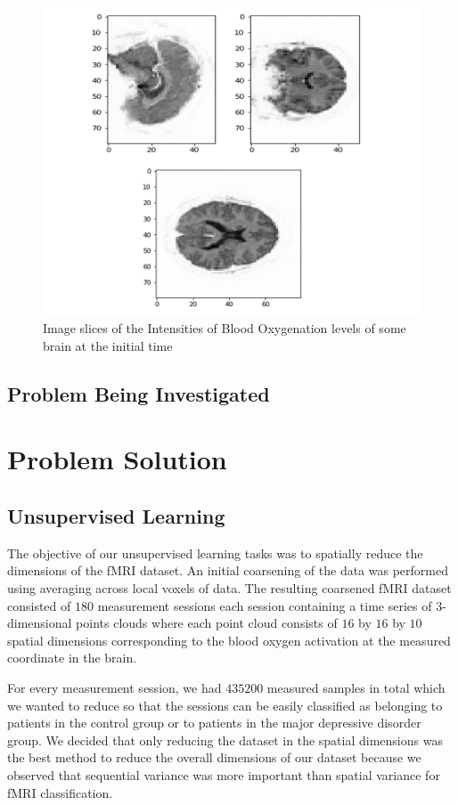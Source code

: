 \documentclass{article}[12pt]
\begin{document}
   \begin{figure}[!htb]
   	\centering
   	\includegraphics[scale=0.7]{brain_slices}
   	\caption{Image slices of the Intensities of Blood Oxygenation levels of some brain at the initial time}
   	\label{fig:brainSlice}
   \end{figure}
   
   \subsection{Problem Being Investigated}
   
   
   \section{Problem Solution}
   \subsection{Unsupervised Learning}
   The objective of our unsupervised learning tasks was to spatially reduce the dimensions of the fMRI dataset. An initial coarsening of the data was performed using averaging across local voxels of data. The resulting coarsened fMRI dataset consisted of $180$ measurement sessions each session containing a time series of $3$-dimensional points clouds where each point cloud consists of $16$ by $16$ by $10$ spatial dimensions corresponding to the blood oxygen activation at the measured coordinate in the brain.  
   
   For every measurement session, we had $435200$ measured samples in total which we wanted to reduce so that the sessions can be easily classified as belonging to patients in the control group or to patients in the major depressive disorder group. We decided that only reducing the dataset in the spatial dimensions was the best method to reduce the overall dimensions of our dataset because we observed that sequential variance was more important than spatial variance for fMRI classification. 
   
\end{document}
